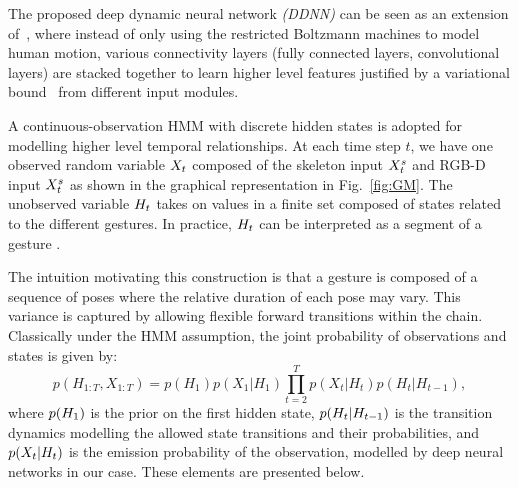 The proposed deep dynamic neural network \emph{(DDNN)} can be seen as an extension of~\cite{diwucvpr14}, where instead of only using the restricted Boltzmann machines to model human motion, various connectivity layers (fully connected layers, convolutional layers) are stacked together to learn higher level features justified by a variational bound~\cite{hinton2006fast} from different input modules.

A continuous-observation HMM with discrete hidden states is adopted for modelling higher level temporal relationships. 
At each time step $t$, we have one observed random variable $X_t$ 
composed of the skeleton input $X^{s}_t$ and RGB-D input $X^{s}_t$ 
as shown in the graphical representation in Fig.~\ref{fig:GM}.
%
 The unobserved variable $H_t$ takes on values in a finite set  \finiteset composed of \numberhiddenstate states related to 
the different gestures. In practice,  $H_t$ can be interpreted as a segment of a gesture \gesturea{}.

 The intuition motivating this construction is that a gesture is composed of a sequence of poses where the relative duration of each pose may vary. This variance is captured by allowing flexible forward transitions within the chain.
 Classically under the HMM assumption, the joint probability of observations and states is given by:
\begin{equation}
p(H_{1:T},X_{1:T}) = p(H_1)p(X_1 | H_1) \prod^{T}_{t=2} p(X_t | H_t ) p(H_t | H_{t-1}),
\label{HMM_GM_1}
\end{equation}
where $p(H_1)$ is the prior on the first hidden state, $p(H_t|H_{t-1})$ 
is the transition dynamics modelling the allowed state transitions and their probabilities, 
 and $p(X_t | H_t )$ is the emission probability of the observation, 
modelled by  deep neural networks in our case. These elements are presented below.




